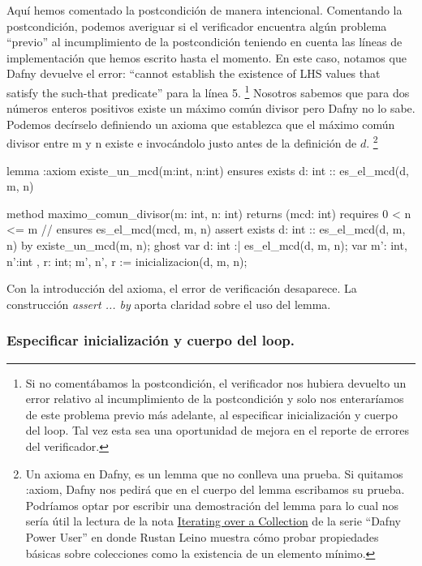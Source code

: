 \documentclass[12pt, a4paper, openany, fleqn]{book}
\begin{document}
    Aquí hemos comentado la postcondición de manera intencional. Comentando la postcondición, podemos averiguar si el verificador encuentra algún problema ``previo'' al incumplimiento de la postcondición teniendo en cuenta las líneas de implementación que hemos escrito hasta el momento.
    En este caso, notamos que Dafny devuelve el error: ``cannot establish the existence of LHS values that satisfy the such-that predicate'' para la línea 5. \footnote{Si no comentábamos la postcondición, el verificador nos hubiera devuelto un error relativo al incumplimiento de la postcondición y solo nos enteraríamos de este problema previo más adelante, al especificar inicialización y cuerpo del loop. Tal vez esta sea una oportunidad de mejora en el reporte de errores del verificador.}
    Nosotros sabemos que para dos números enteros positivos existe un máximo común divisor pero Dafny no lo sabe. Podemos decírselo definiendo un axioma que establezca que el máximo común divisor entre m y n existe e invocándolo justo antes de la definición de $d$. \footnote{Un axioma en Dafny, es un lemma que no conlleva una prueba. Si quitamos :axiom, Dafny nos pedirá que en el cuerpo del lemma escribamos su prueba. Podríamos optar por escribir una demostración del lemma para lo cual nos sería útil la lectura de la nota \href{https://leino.science/papers/krml275.html}{Iterating over a Collection} de la serie ``Dafny Power User'' en donde Rustan Leino muestra cómo probar propiedades básicas sobre colecciones como la existencia de un elemento mínimo.}

    \begin{dafny}
lemma {:axiom} existe_un_mcd(m:int, n:int)
    ensures exists d: int :: es_el_mcd(d, m, n)

method maximo_comun_divisor(m: int, n: int) returns (mcd: int)
    requires 0 < n <= m
    // ensures es_el_mcd(mcd, m, n)
{
    assert exists d: int :: es_el_mcd(d, m, n) by {
        existe_un_mcd(m, n);
    }
    ghost var d: int :| es_el_mcd(d, m, n);
    var m': int, n':int , r: int;
    m', n', r := inicializacion(d, m, n);
}
    \end{dafny}

    Con la introducción del axioma, el error de verificación desaparece. La construcción \textit{assert ... by} aporta claridad sobre el uso del lemma.

    \subsubsection*{Especificar inicialización y cuerpo del loop.}
\end{document}
